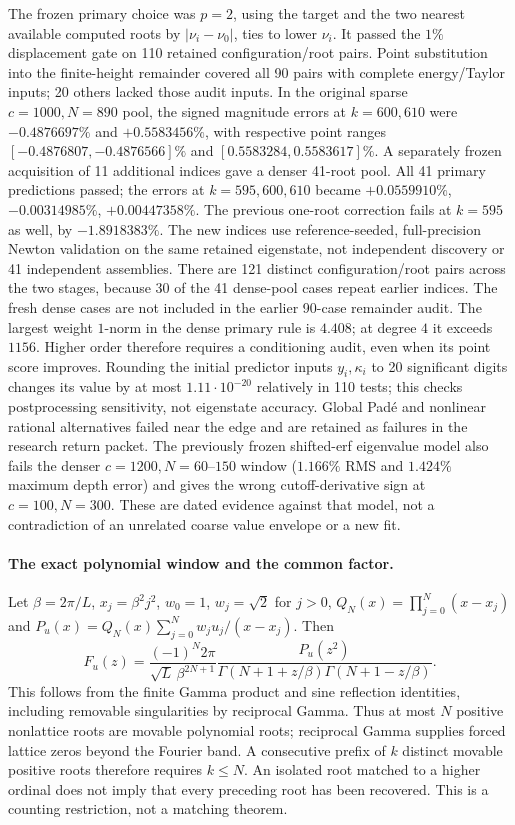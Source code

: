 The frozen primary choice was $p=2$, using the target and the two nearest
available computed roots by $|\nu_i-\nu_0|$, ties to lower $\nu_i$.
It passed the $1\%$ displacement gate on 110 retained configuration/root pairs.
Point substitution into the finite-height remainder covered all 90 pairs with
complete energy/Taylor inputs; 20 others lacked those audit inputs. In the
original sparse $c=1000,N=890$ pool, the signed magnitude errors at $k=600,610$
were $-0.4876697\%$ and $+0.5583456\%$, with respective point ranges
$[-0.4876807,-0.4876566]\%$ and $[0.5583284,0.5583617]\%$.
A separately frozen acquisition of 11 additional indices gave a denser 41-root
pool. All 41 primary predictions passed; the errors at $k=595,600,610$ became
$+0.0559910\%$, $-0.00314985\%$, $+0.00447358\%$. The previous one-root
correction fails at $k=595$ as well, by $-1.8918383\%$.
The new indices use reference-seeded, full-precision Newton validation on the
same retained eigenstate, not independent discovery or 41 independent assemblies.
There are 121 distinct configuration/root pairs across the two stages,
because 30 of the 41 dense-pool cases repeat earlier indices.
The fresh dense cases are not included in the earlier 90-case remainder audit.
The largest weight $1$-norm in the dense primary rule is $4.408$; at degree
$4$ it exceeds $1156$. Higher order therefore requires a conditioning audit,
even when its point score improves. Rounding the initial predictor inputs
$y_i,\kappa_i$ to 20 significant digits changes its value by at most
$1.11\cdot10^{-20}$ relatively in 110 tests; this checks postprocessing
sensitivity, not eigenstate accuracy.
Global Pad\'e and nonlinear rational alternatives failed near the edge and are
retained as failures in the research return packet. The previously frozen
shifted-erf eigenvalue model also fails the denser $c=1200,N=60$--$150$ window
($1.166\%$ RMS and $1.424\%$ maximum depth error) and gives the wrong cutoff-derivative
sign at $c=100,N=300$. These are dated evidence against that model, not a
contradiction of an unrelated coarse value envelope or a new fit.

\paragraph{The exact polynomial window and the common factor.}
Let $\beta=2\pi/L$, $x_j=\beta^2j^2$, $w_0=1$, $w_j=\sqrt2$ for $j>0$,
$Q_N(x)=\prod_{j=0}^N(x-x_j)$ and
$P_u(x)=Q_N(x)\sum_{j=0}^N w_ju_j/(x-x_j)$. Then
\begin{equation}\label{eq:attack-gamma-bridge}
 F_u(z)=\frac{(-1)^N2\pi}{\sqrt L\,\beta^{2N+1}}
       \frac{P_u(z^2)}{\Gamma(N+1+z/\beta)\Gamma(N+1-z/\beta)}.
\end{equation}
This follows from the finite Gamma product and sine reflection identities,
including removable singularities by reciprocal Gamma. Thus at most $N$
positive nonlattice roots are movable polynomial roots; reciprocal Gamma
supplies forced lattice zeros beyond the Fourier band. A consecutive prefix
of $k$ distinct movable positive roots therefore requires $k\le N$. An
isolated root matched to a higher ordinal does not imply that every preceding
root has been recovered. This is a counting restriction, not a matching theorem.

